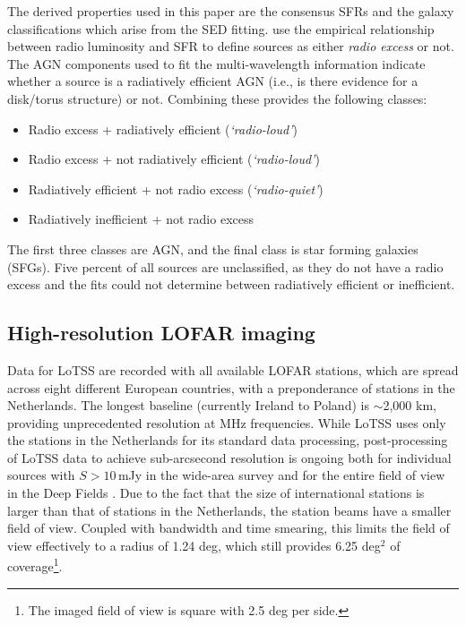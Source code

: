 \documentclass[usenatbib,fleqn,letters]{mnras}
\begin{document}
The derived properties used in this paper are the consensus SFRs and the galaxy classifications which arise from the SED fitting.  use the empirical relationship between radio luminosity and SFR to define sources as either \textit{radio excess} or not. The AGN components used to fit the multi-wavelength information indicate whether a source is a radiatively efficient AGN (i.e., is there evidence for a disk/torus structure) or not. Combining these provides the following classes:
\begin{itemize}
    \item Radio excess + radiatively efficient (\textit{`radio-loud'})
    \item Radio excess + not radiatively efficient (\textit{`radio-loud'})
    \item Radiatively efficient + not radio excess (\textit{`radio-quiet'})
    \item Radiatively inefficient + not radio excess
\end{itemize}
The first three classes are AGN, and the final class is star forming galaxies (SFGs).  Five percent of all sources are unclassified, as they do not have a radio excess and the fits could not determine between radiatively efficient or inefficient. 


\subsection{High-resolution LOFAR imaging}
\label{subsec:highres}

Data for LoTSS are recorded with all available LOFAR stations, which are spread across eight different European countries, with a preponderance of stations in the Netherlands. The longest baseline (currently Ireland to Poland) is $\sim$2,000 km, providing unprecedented resolution at MHz frequencies. While LoTSS uses only the stations in the Netherlands for its standard data processing, post-processing of LoTSS data to achieve sub-arcsecond resolution is ongoing both for individual sources with $S>10\,$mJy in the wide-area survey \citep{morabito_sub-arcsecond_2022} and for the entire field of view in the Deep Fields \citep[][Escott et al., in prep; Bondi et al., in prep]{sweijen_deep_2022,de_jong_into_2024}. %
Due to the fact that the size of international stations is larger than that of stations in the Netherlands, the station beams have a smaller field of view. Coupled with bandwidth and time smearing, this limits the field of view effectively to a radius of 1.24 deg, which still provides 6.25 deg$^2$ of coverage\footnote{The imaged field of view is square with 2.5 deg per side.}. 
\end{document}
